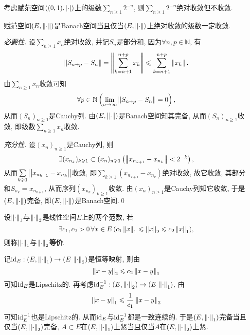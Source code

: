     \begin{Remark}
    考虑赋范空间$ ((0,1),\left| \cdot \right| ) $上的级数$ \sum\limits_{n\geqslant 1}2^{-n} $, 则$ \sum\limits_{n\geqslant 1}2^{-n} $绝对收敛但不收敛.
    \end{Remark}

    \begin{Theorem}
    赋范空间$ (E,\left\| \cdot \right\|) $是Banach空间当且仅当$ (E,\left\| \cdot \right\|) $上绝对收敛的级数一定收敛.
    \end{Theorem}
    \begin{Proof}
    \textsl{必要性.} 设$ \sum\limits_{n\geqslant 1}x_n $绝对收敛, 并记$ S_n $是部分和, 因为$ \forall n,p\in\mathbb{N} $, 有
    \[
    \left\| S_{n+p}-S_n \right\|=\left\| \sum_{k=n+1}^{n+p}x_k \right\|\leqslant\sum_{k=n+1}^{n+p}\left\| x_k \right\|.
    \]
    由$ \sum\limits_{n\geqslant 1}x_n $收敛可知
    \[
    \forall p\in\mathbb{N}\left(\lim_{n\to\infty}\left\| S_{n+p}-S_n \right\|=0\right),
    \]
    从而$ (S_n)_{n\geqslant 1} $是Cauchy列. 由$ (E,\left\| \cdot \right\|) $是Banach空间知其完备, 从而$ (S_n)_{n\geqslant 1} $收敛, 即级数$ \sum\limits_{n\geqslant 1}x_n $收敛.

    \textsl{充分性.} 设$ (x_n)_{n\geqslant 1} $是Cauchy列, 则
    \[
    \exists(x_{n_k})_{k\geqslant 1}\subset(x_n)_{n\geqslant 1}\left(\left\| x_{n_{k+1}}-x_{n_k} \right\|<2^{-k}\right),
    \]
    从而$ \sum\limits_{k\geqslant 1}\left\| x_{n_{k+1}}-x_{n_k} \right\| $收敛, 即$ \sum\limits_{k\geqslant 1}(x_{n_{k+1}}-x_{n_k}) $绝对收敛, 故它收敛, 其部分和$ S_{n_k}=x_{n_{k+1}} $, 从而序列$ (x_{n_k})_{k\geqslant 1} $收敛. 由$ (x_n)_{n\geqslant 1} $是Cauchy列知它收敛, 于是$ (E,\left\| \cdot \right\|) $完备, 即$ (E,\left\| \cdot \right\|) $是Banach空间.\qed
    \end{Proof}

    \begin{Definition}[范数等价]
        设$ \left\| \cdot \right\|_1 $与$ \left\| \cdot \right\|_2 $是线性空间$ E $上的两个范数, 若
        \[
        \exists c_1,c_2>0\,\forall x\in E\,(c_1\left\| x \right\|_1\leqslant\left\| x \right\|_2\leqslant c_2\left\| x \right\|_1),
        \]
        则称$ \left\| \cdot \right\|_1 $与$ \left\| \cdot \right\|_2 $\textbf{等价}.
    \end{Definition}

    \begin{Remark}
    记$ \mathrm{id}_E : (E,\left\| \cdot \right\|_1)\to(E\,\left\| \cdot \right\|_2) $是恒等映射, 则由
    \[
    \left\| x-y \right\|_2\leqslant c_2\left\| x-y \right\|_1
    \]
    可知$ \mathrm{id}_E $是Lipschitz的. 再考虑$ \mathrm{id}_E^{-1} : (E,\left\| \cdot \right\|_2)\to(E\,\left\| \cdot \right\|_1) $, 由
    \[
    \left\| x-y \right\|_1\leqslant\frac{1}{c_1}\left\| x-y \right\|_2
    \]
    可知$ \mathrm{id}_E^{-1} $也是Lipschitz的. 从而$ \mathrm{id}_E $与$ \mathrm{id}_E^{-1} $都是一致连续的. 于是$ (E,\left\| \cdot \right\|_1) $完备当且仅当$ (E,\left\| \cdot \right\|_2) $完备, $ A\subset E $在$ (E,\left\| \cdot \right\|_1) $上紧当且仅当$ A $在$ (E,\left\| \cdot \right\|_2) $上紧.
    \end{Remark}

